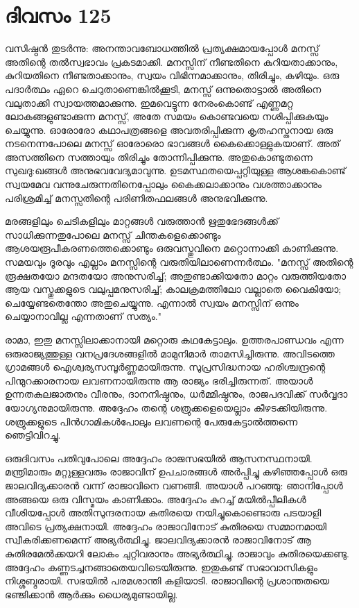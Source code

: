  
\section{ദിവസം 125}


വസിഷ്ഠന്‍ തുടര്‍ന്നു: അനന്താവബോധത്തില്‍ പ്രത്യക്ഷമായപ്പോള്‍ മനസ്സ്‌ അതിന്റെ തല്‍സ്വഭാവം പ്രകടമാക്കി. മനസ്സിന് നീണ്ടതിനെ കുറിയതാക്കാനും, കുറിയതിനെ നീണ്ടതാക്കാനും, സ്വയം വിഭിന്നമാക്കാനും, തിരിച്ചും, കഴിയും. ഒരു പദാര്‍ത്ഥം ഏറെ ചെറുതാണെങ്കില്‍ക്കൂടി, മനസ്സ്‌ ഒന്നുതൊട്ടാല്‍ അതിനെ വലുതാക്കി സ്വായത്തമാക്കുന്നു. ഇമവെട്ടുന്ന നേരംകൊണ്ട്‌ എണ്ണമറ്റ ലോകങ്ങളുണ്ടാക്കുന്ന മനസ്സ്‌, അതേ സമയം കൊണ്ടവയെ നശിപ്പിക്കുകയും ചെയ്യുന്നു. ഓരോരോ കഥാപത്രങ്ങളെ അവതരിപ്പിക്കുന്ന കൃതഹസ്തനായ ഒരു നടനെന്നപോലെ മനസ്സ്‌ ഓരോരൊ ഭാവങ്ങള്‍ കൈക്കൊള്ളുകയാണ്‌. അത്‌ അസത്തിനെ സത്തായും തിരിച്ചും തോന്നിപ്പിക്കുന്നു. അതുകൊണ്ടുതന്നെ സുഖദു:ഖങ്ങള്‍ അനുഭവവേദ്യമാവുന്നു. ഉടമസ്ഥതയെപ്പറ്റിയുള്ള ആശങ്കകൊണ്ട്‌ സ്വയമേവ വന്നുചേരുന്നതിനെപ്പോലും കൈക്കലാക്കാനും വശത്താക്കാനും പരിശ്രമിച്ച്‌ മനസ്സതിന്റെ പരിണിതഫലങ്ങള്‍ അനുഭവിക്കുന്നു.

മരങ്ങളിലും ചെടികളിലും മാറ്റങ്ങള്‍ വരുത്താന്‍ ഋതുഭേദങ്ങള്‍ക്ക്‌ സാധിക്കുന്നതുപോലെ മനസ്സ്‌ ചിന്തകളെക്കൊണ്ടും ആശയരൂപീകരണത്തെക്കൊണ്ടും ഒരുവസ്തുവിനെ മറ്റൊന്നാക്കി കാണിക്കുന്നു. സമയവും ദൂരവും എല്ലാം മനസ്സിന്റെ വരുതിയിലാണെന്നര്‍ത്ഥം. "മനസ്സ്‌ അതിന്റെ രൂക്ഷതയോ മന്ദതയോ അനുസരിച്ച്‌; അതുണ്ടാക്കിയതോ മാറ്റം വരുത്തിയതോ ആയ വസ്തുക്കളുടെ വലുപ്പമനുസരിച്ച്‌; കാലക്രമത്തിലോ വല്ലാതെ വൈകിയോ; ചെയ്യേണ്ടതെന്തോ അതുചെയ്യുന്നു. എന്നാല്‍ സ്വയം മനസ്സിന്‌ ഒന്നും ചെയ്യാനാവില്ല എന്നതാണ്‌ സത്യം."

രാമാ, ഇതു മനസ്സിലാക്കാനായി മറ്റൊരു കഥകേട്ടാലും. ഉത്തരപാണ്ഡവം എന്ന ഒരുരാജ്യത്തുള്ള വനപ്രദേശങ്ങളില്‍ മാമുനിമാര്‍ താമസിച്ചിരുന്നു. അവിടത്തെ ഗ്രാമങ്ങള്‍ ഐശ്വര്യസമ്പൂര്‍ണ്ണമായിരുന്നു. സുപ്രസിദ്ധനായ ഹരിശ്ചന്ദ്രന്റെ പിന്മുറക്കാരനായ ലവണനായിരുന്നു ആ രാജ്യം ഭരിച്ചിരുന്നത്‌. അയാള്‍ ഉന്നതകുലജാതനും വീരനും, ദാനനിഷ്ഠനും, ധര്‍മ്മിഷ്ഠനും, രാജപദവിക്ക്‌ സര്‍വ്വദാ യോഗ്യനുമായിരുന്നു. അദ്ദേഹം തന്റെ ശത്രുക്കളെയെല്ലാം കീഴടക്കിയിരുന്നു. ശത്രുക്കളുടെ പിന്‍ഗാമികള്‍പോലും ലവണന്റെ പേരുകേട്ടാല്‍ത്തന്നെ ഞെട്ടിവിറച്ചു.

ഒരുദിവസം പതിവുപോലെ അദ്ദേഹം രാജസഭയില്‍ ആസനസ്ഥനായി. മന്ത്രിമാരും മറ്റുള്ളവരും രാജാവിന്‌ ഉപചാരങ്ങള്‍ അര്‍പ്പിച്ചു  കഴിഞ്ഞപ്പോള്‍ ഒരു ജാലവിദ്യക്കാരന്‍ വന്ന് രാജാവിനെ വണങ്ങി. അയാള്‍ പറഞ്ഞു: ഞാനിപ്പോള്‍ അങ്ങയെ ഒരു വിസ്മയം കാണിക്കാം. അദ്ദേഹം കുറച്ച്‌ മയില്‍പ്പീലികള്‍ വീശിയപ്പോള്‍ അതിസുന്ദരനായ കുതിരയെ നയിച്ചുകൊണ്ടൊരു പടയാളി അവിടെ പ്രത്യക്ഷനായി. അദ്ദേഹം രാജാവിനോട്‌ കുതിരയെ സമ്മാനമായി സ്വീകരിക്കണമെന്ന് അഭ്യര്‍ത്ഥിച്ചു. ജാലവിദ്യക്കാരന്‍ രാജാവിനോട്‌ ആ കുതിരമേല്‍ക്കയറി ലോകം ചുറ്റിവരാനും അഭ്യര്‍ത്ഥിച്ചു. രാജാവും കുതിരയെക്കണ്ടു. അദ്ദേഹം കണ്ണടച്ചനങ്ങാതെയവിടെയിരുന്നു. ഇതുകണ്ട്‌ സഭാവാസികളും നിശ്ശബ്ദരായി. സഭയില്‍ പരമശാന്തി കളിയാടി. രാജാവിന്റെ പ്രശാന്തതയെ ഭഞ്ജിക്കാന്‍ ആര്‍ക്കും ധൈര്യമുണ്ടായില്ല.

